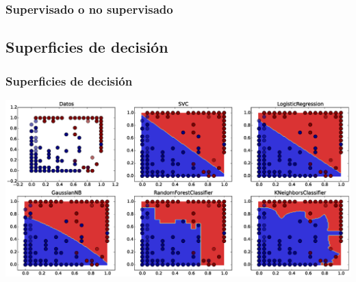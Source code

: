 \documentclass[10pt]{beamer}
\begin{document}
\begin{frame}
	\frametitle{Supervisado o no supervisado}
	\begin{figure}[htbp]
	\centering
	\qquad\quad
\end{figure}
\end{frame}

\subsection{Superficies de decisi\'on}

\begin{frame}
	\frametitle{Superficies de decisi\'on}
	\centering\includegraphics[width = 1.0\textwidth]{digitos,_curvas_de_decision21-28}
\end{frame}
\end{document}
